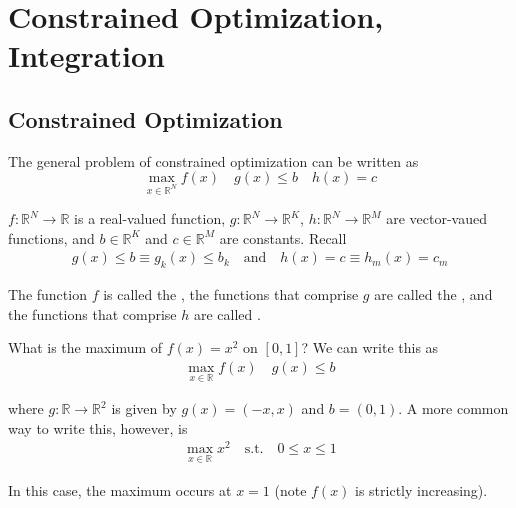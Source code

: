 \documentclass{article}
\begin{document}
\displayoptions

\section{Constrained Optimization, Integration}
\label{sec:constrained_optimization_integration}

\localtableofcontents

\subsection{Constrained Optimization}
\label{sub:constrained_optimization}

The general problem of constrained optimization can be written as
\begin{equation}\label{eq:lecture5_main_problem}
  \max_{x \in \mathbb{R}^N} f(x)
  \quad
  g(x) \le b
  \quad
  h(x) = c
\end{equation}


$f: \mathbb{R}^N \to \mathbb{R}$ is a real-valued function, $g: \mathbb{R}^N \to \mathbb{R}^K$, $h: \mathbb{R}^N \to \mathbb{R}^M$ are vector-vaued functions, and $b \in \mathbb{R}^K$ and $c \in \mathbb{R}^M$ are constants. Recall
\begin{align*}
  g(x) \le b \equiv g_k(x) \le b_k
  \quad\text{and}\quad
  h(x) = c \equiv h_m(x) = c_m
\end{align*}

The function $f$ is called the , the functions that comprise $g$ are called the , and the functions that comprise $h$ are called .

\begin{example}
  What is the maximum of $f(x) = x^2$ on $[0, 1]$? We can write this as
  \begin{align*}
    \max_{x \in \mathbb{R}} f(x)
    \quad
    g(x) \le b
  \end{align*}

  where $g: \mathbb{R} \to \mathbb{R}^2$ is given by $g(x) = (-x, x)$ and $b = (0, 1)$. A more common way to write this, however, is
  \begin{align*}
    \max_{x \in \mathbb{R}} x^2
    \quad\text{s.t.}\quad
    0 \le x \le 1
  \end{align*}

  In this case, the maximum occurs at $x = 1$ (note $f(x)$ is strictly increasing).
\end{example}
\end{document}
